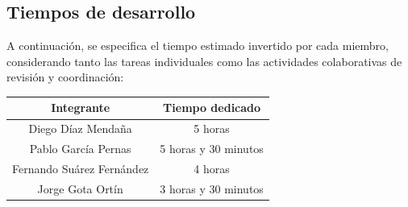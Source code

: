 \documentclass[11pt,a4paper]{article}
\begin{document}
\subsection{Tiempos de desarrollo}
A continuación, se especifica el tiempo estimado invertido por cada miembro, considerando tanto las tareas individuales como las actividades colaborativas de revisión y coordinación: \vspace{2ex}
\begin{center}
  \renewcommand{\arraystretch}{1.2}
  \begin{tabular}{|c|c|}
    \hline
    \textbf{Integrante}\cellcolor{azulSuave} & \textbf{Tiempo dedicado}\cellcolor{azulSuave} \\
    \hline
    Diego Díaz Mendaña & 5 horas \\
    Pablo García Pernas & 5 horas y 30 minutos \\
    Fernando Suárez Fernández & 4 horas \\
    Jorge Gota Ortín & 3 horas y 30 minutos \\
    \hline
  \end{tabular}
\end{center}
\end{document}
